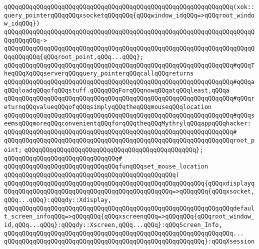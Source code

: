 \verb|qQQqqQQqqQQqqQQqqQQqqQQqqQQqqQQqqQQqqQQqqQQqqQQqqQQqqQQqqQQqqQQq(xok::query_pointerqQQqqQQqxsocketqQQqqQQq{qQQqwindow_idqQQq=>qQQqroot_window_idqQQq})|\newline
\verb|qQQqqQQqqQQqqQQqqQQqqQQqqQQqqQQqqQQqqQQqqQQqqQQqqQQqqQQqqQQqqQQqqQQqqQQqqQQqqQQq->|\newline
\verb|qQQqqQQqqQQqqQQqqQQqqQQqqQQqqQQqqQQqqQQqqQQqqQQqqQQqqQQqqQQqqQQqqQQqqQQqqQQqqQQq{qQQqroot_point,qQQq...qQQq};|\newline
\newline
\verb|qQQqqQQqqQQqqQQqqQQqqQQqqQQqqQQqqQQqqQQqqQQqqQQqqQQqqQQqqQQqqQQq#qQQqTheqQQqXqQQqserverqQQqquery_pointerqQQqcallqQQqreturns|\newline
\verb|qQQqqQQqqQQqqQQqqQQqqQQqqQQqqQQqqQQqqQQqqQQqqQQqqQQqqQQqqQQqqQQq#qQQqaqQQqloadqQQqofqQQqstuff.qQQqqQQqForqQQqnowqQQqatqQQqleast,qQQqa|\newline
\verb|qQQqqQQqqQQqqQQqqQQqqQQqqQQqqQQqqQQqqQQqqQQqqQQqqQQqqQQqqQQqqQQq#qQQqreturnqQQqvalueqQQqofqQQqsimplyqQQqtheqQQqmouseqQQqlocation|\newline
\verb|qQQqqQQqqQQqqQQqqQQqqQQqqQQqqQQqqQQqqQQqqQQqqQQqqQQqqQQqqQQqqQQq#qQQqseemsqQQqmoreqQQqconvenientqQQqforqQQqtheqQQqMythrylqQQqappqQQqhacker:|\newline
\verb|qQQqqQQqqQQqqQQqqQQqqQQqqQQqqQQqqQQqqQQqqQQqqQQqqQQqqQQqqQQqqQQq#|\newline
\verb|qQQqqQQqqQQqqQQqqQQqqQQqqQQqqQQqqQQqqQQqqQQqqQQqqQQqqQQqqQQqqQQqroot_point;|\newline
\verb|qQQqqQQqqQQqqQQqqQQqqQQqqQQqqQQqqQQqqQQqqQQqqQQq};|\newline
\verb|qQQqqQQqqQQqqQQqqQQqqQQqqQQqqQQq#|\newline
\verb|qQQqqQQqqQQqqQQqqQQqqQQqqQQqqQQqfunqQQqset_mouse_location|\newline
\verb|qQQqqQQqqQQqqQQqqQQqqQQqqQQqqQQqqQQqqQQqqQQqqQQq(|\newline
\verb|qQQqqQQqqQQqqQQqqQQqqQQqqQQqqQQqqQQqqQQqqQQqqQQqqQQqqQQq{qQQqxdisplayqQQqqQQqqQQqqQQqqQQqqQQqqQQqqQQqqQQqqQQqqQQqqQQq=>qQQqqQQq{qQQqxsocket,qQQq...qQQq}:qQQqdy::Xdisplay,|\newline
\verb|qQQqqQQqqQQqqQQqqQQqqQQqqQQqqQQqqQQqqQQqqQQqqQQqqQQqqQQqqQQqqQQqdefault_screen_infoqQQq=>qQQqqQQq{qQQqxscreenqQQq=>qQQqqQQq{qQQqroot_window_id,qQQq...qQQq}:qQQqdy::Xscreen,qQQq...qQQq}:qQQqScreen_Info,|\newline
\verb|qQQqqQQqqQQqqQQqqQQqqQQqqQQqqQQqqQQqqQQqqQQqqQQqqQQqqQQqqQQqqQQq...|\newline
\verb|qQQqqQQqqQQqqQQqqQQqqQQqqQQqqQQqqQQqqQQqqQQqqQQqqQQqqQQq}:qQQqXsession|\newline
